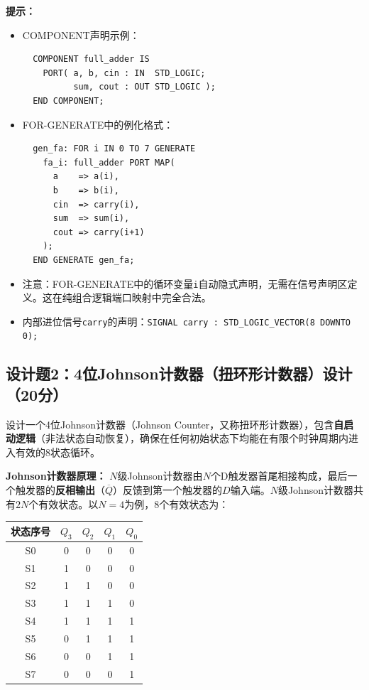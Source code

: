 \begin{framed}
\textbf{提示：}
\begin{itemize}
  \item COMPONENT声明示例：
  \begin{verbatim}
  COMPONENT full_adder IS
    PORT( a, b, cin : IN  STD_LOGIC;
          sum, cout : OUT STD_LOGIC );
  END COMPONENT;
  \end{verbatim}
  \item FOR-GENERATE中的例化格式：
  \begin{verbatim}
  gen_fa: FOR i IN 0 TO 7 GENERATE
    fa_i: full_adder PORT MAP(
      a    => a(i),
      b    => b(i),
      cin  => carry(i),
      sum  => sum(i),
      cout => carry(i+1)
    );
  END GENERATE gen_fa;
  \end{verbatim}
  \item 注意：FOR-GENERATE中的循环变量\texttt{i}自动隐式声明，无需在信号声明区定义。这在纯组合逻辑端口映射中完全合法。
  \item 内部进位信号\texttt{carry}的声明：\texttt{SIGNAL carry : STD\_LOGIC\_VECTOR(8 DOWNTO 0);}
\end{itemize}
\end{framed}

\newpage

\subsection*{设计题2：4位Johnson计数器（扭环形计数器）设计（20分）}

设计一个4位Johnson计数器（Johnson Counter，又称扭环形计数器），包含\textbf{自启动逻辑}（非法状态自动恢复），确保在任何初始状态下均能在有限个时钟周期内进入有效的8状态循环。

\vspace{0.3cm}

\textbf{Johnson计数器原理：}
$N$级Johnson计数器由$N$个D触发器首尾相接构成，最后一个触发器的\textbf{反相输出}（$\overline{Q}$）反馈到第一个触发器的$D$输入端。$N$级Johnson计数器共有$2N$个有效状态。以$N=4$为例，8个有效状态为：

\begin{center}
\begin{tabular}{|c|c|c|c|c|}
\hline
\textbf{状态序号} & \textbf{$Q_3$} & \textbf{$Q_2$} & \textbf{$Q_1$} & \textbf{$Q_0$} \\
\hline
S0 & 0 & 0 & 0 & 0 \\
S1 & 1 & 0 & 0 & 0 \\
S2 & 1 & 1 & 0 & 0 \\
S3 & 1 & 1 & 1 & 0 \\
S4 & 1 & 1 & 1 & 1 \\
S5 & 0 & 1 & 1 & 1 \\
S6 & 0 & 0 & 1 & 1 \\
S7 & 0 & 0 & 0 & 1 \\
\hline
\end{tabular}
\end{center}

